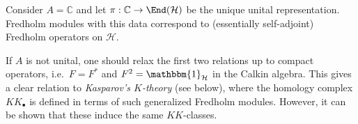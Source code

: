 
    \begin{example}
        Consider $A=\mathbb{C}$ and let $\pi:\mathbb{C}\rightarrow\End(\mathcal{H})$ be the unique unital representation. Fredholm modules with this data correspond to (essentially self-adjoint) Fredholm operators on $\mathcal{H}$.
    \end{example}

    \begin{remark}
        If $A$ is not unital, one should relax the first two relations up to compact operators, i.e.~$F=F^*$ and $F^2=\mathbbm{1}_{\mathcal{H}}$ in the Calkin algebra. This gives a clear relation to \textit{Kasparov's $K$-theory} (see below), where the homology complex $K\!K_\bullet$ is defined in terms of such generalized Fredholm modules. However, it can be shown that these induce the same $K\!K$-classes.
    \end{remark}

